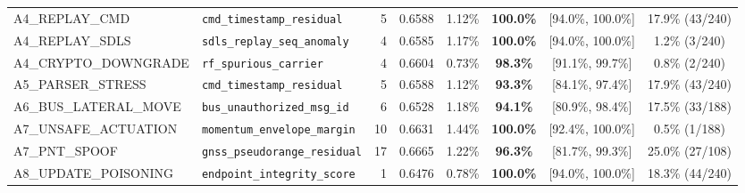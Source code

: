 \begin{table}[t]
{\begin{tabular}{llrccccc}
A4\_REPLAY\_CMD & \texttt{cmd\_timestamp\_residual} & 5 & 0.6588 & 1.12\% & \textbf{100.0\%} & [94.0\%, 100.0\%] & 17.9\% (43/240) \\
A4\_REPLAY\_SDLS & \texttt{sdls\_replay\_seq\_anomaly} & 4 & 0.6585 & 1.17\% & \textbf{100.0\%} & [94.0\%, 100.0\%] & 1.2\% (3/240) \\
A4\_CRYPTO\_DOWNGRADE & \texttt{rf\_spurious\_carrier} & 4 & 0.6604 & 0.73\% & \textbf{98.3\%} & [91.1\%, 99.7\%] & 0.8\% (2/240) \\
A5\_PARSER\_STRESS & \texttt{cmd\_timestamp\_residual} & 5 & 0.6588 & 1.12\% & \textbf{93.3\%} & [84.1\%, 97.4\%] & 17.9\% (43/240) \\
A6\_BUS\_LATERAL\_MOVE & \texttt{bus\_unauthorized\_msg\_id} & 6 & 0.6528 & 1.18\% & \textbf{94.1\%} & [80.9\%, 98.4\%] & 17.5\% (33/188) \\
A7\_UNSAFE\_ACTUATION & \texttt{momentum\_envelope\_margin} & 10 & 0.6631 & 1.44\% & \textbf{100.0\%} & [92.4\%, 100.0\%] & 0.5\% (1/188) \\
A7\_PNT\_SPOOF & \texttt{gnss\_pseudorange\_residual} & 17 & 0.6665 & 1.22\% & \textbf{96.3\%} & [81.7\%, 99.3\%] & 25.0\% (27/108) \\
A8\_UPDATE\_POISONING & \texttt{endpoint\_integrity\_score} & 1 & 0.6476 & 0.78\% & \textbf{100.0\%} & [94.0\%, 100.0\%] & 18.3\% (44/240) \\
\hline
\end{tabular}
}
\end{table}
